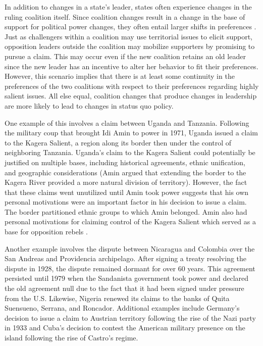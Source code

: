 
In addition to changes in a state’s leader, states often experience changes in the ruling coalition itself. Since coalition changes result in a change in the base of support for political power changes, they often entail larger shifts in preferences \citep{bdm2003, cox1982, mattes2015, mattes2016}. Just as challengers within a coalition may use territorial issues to elicit support, opposition leaders outside the coalition may mobilize supporters by promising to pursue a claim. This may occur even if the new coalition retains an old leader since the new leader has an incentive to alter her behavior to fit their preferences. However, this scenario implies that there is at least some continuity in the preferences of the two coalitions with respect to their preferences regarding highly salient issues. All else equal, coalition changes that produce changes in leadership are more likely to lead to changes in status quo policy. 



One example of this involves a claim between Uganda and Tanzania. Following the military coup that brought Idi Amin to power in 1971, Uganda issued a claim to the Kagera Salient, a region along its border then under the control of neighboring Tanzania. Uganda’s claim to the Kagera Salient could potentially be justified on multiple bases, including historical agreements, ethnic unification, and geographic considerations (Amin argued that extending the border to the Kagera River provided a more natural division of territory). However, the fact that these claims went unutilized until Amin took power suggests that his own personal motivations were an important factor in his decision to issue a claim. The border partitioned ethnic groups to which Amin belonged. Amin also had personal motivations for claiming control of the Kagera Salient which served as a base for opposition rebels \citep{valeriano2011}.


Another example involves the dispute between Nicaragua and Colombia over the San Andreas and Providencia archipelago. After signing a treaty resolving the dispute in 1928, the dispute remained dormant for over 60 years. This agreement persisted until 1979 when the Sandanista government took power and declared the old agreement null due to the fact that it had been signed under pressure from the U.S. Likewise, Nigeria renewed its claims to the banks of Quita Suensueno, Serrana, and Roncador. Additional examples include Germany’s decision to issue a claim to Austrian territory following the rise of the Nazi party in 1933 and Cuba’s decision to contest the American military presence on the island following the rise of Castro’s regime.

